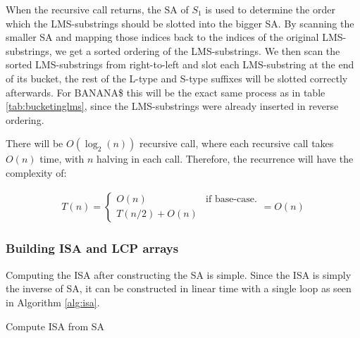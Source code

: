 When the recursive call returns, the SA of $S_1$ is used to determine the order which the
LMS-substrings should be slotted into the bigger SA. By scanning the smaller SA and
mapping those indices back to the indices of the original LMS-substrings, we get a sorted
ordering of the LMS-substrings. We then scan the sorted LMS-substrings from right-to-left
and slot each LMS-substring at the end of its bucket, the rest of the L-type and S-type
suffixes will be slotted correctly afterwards. For BANANA\$ this will be the exact same
process as in table \ref{tab:bucketinglms}, since the LMS-substrings were already inserted
in reverse ordering.


There will be $O(\log_2(n))$ recursive call, where each recursive call takes $O(n)$ time,
with $n$ halving in each call. Therefore, the recurrence will have the complexity of:

\begin{gather*}
    T(n) =
\begin{cases}
    O(n) & \text{if base-case.} \\
    T(n / 2) + O(n)
\end{cases}
= O(n)
\end{gather*}

\subsubsection{Building ISA and LCP arrays}

Computing the ISA after constructing the SA is simple. Since the ISA is simply the inverse
of SA, it can be constructed in linear time with a single loop as seen in Algorithm
\ref{alg:isa}.

\begin{algorithm}[htp]
  \SetAlgoLined\DontPrintSemicolon

  \vspace{0.5cm}
  \caption{Compute ISA from SA}
  \label{alg:isa}
\end{algorithm}


